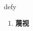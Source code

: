 
\begin{frame}
{\huge defy}
\begin{center}
\begin{enumerate}\Large
  \item \textbf{蔑视}
\end{enumerate}
\end{center}
\end{frame}
